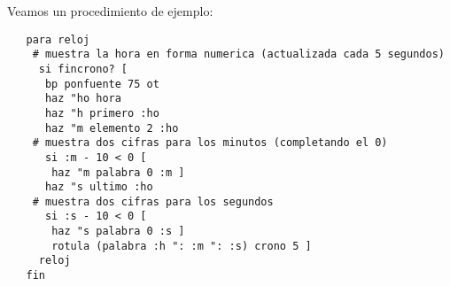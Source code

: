 Veamos un procedimiento de ejemplo:
\begin{verbatim}
   para reloj 
    # muestra la hora en forma numerica (actualizada cada 5 segundos)
     si fincrono? [ 
      bp ponfuente 75 ot
      haz "ho hora   
      haz "h primero :ho
      haz "m elemento 2 :ho
    # muestra dos cifras para los minutos (completando el 0)
      si :m - 10 < 0 [
       haz "m palabra 0 :m ]
      haz "s ultimo :ho
    # muestra dos cifras para los segundos
      si :s - 10 < 0 [
       haz "s palabra 0 :s ]
       rotula (palabra :h ": :m ": :s) crono 5 ]
     reloj
   fin 
\end{verbatim}
